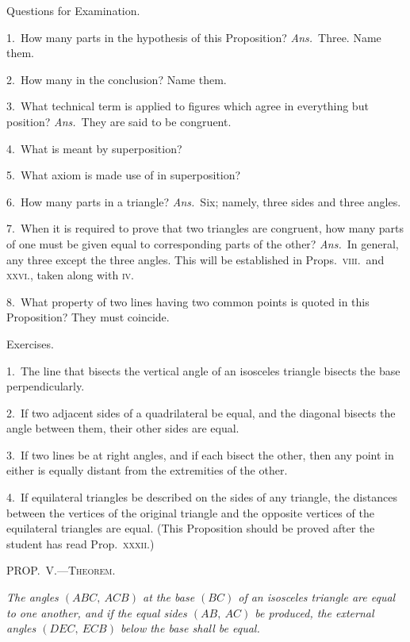 \documentclass[oneside]{book}
\newcommand\mypropl[2]{
\bigskip\Needspace*{4\baselineskip}\begin{center}\textsc{#1}\end{center}
\hspace{\parindent}\emph{#2}\par\medskip
}
\newcommand\exhead[1]{
\Needspace*{5\baselineskip}\begin{center}
\textsf{#1}
\end{center}
}
\begin{document}
\exhead{Questions for Examination.}

\begin{footnotesize}
1.~How many parts in the hypothesis of this Proposition? \textit{Ans.}\
Three. Name them.

2.~How many in the conclusion? Name them.

3.~What technical term is applied to figures which agree in
everything but position? \textit{Ans.}\ They are said to be congruent.

4.~What is meant by superposition?

5.~What axiom is made use of in superposition?

6.~How many parts in a triangle? \textit{Ans.}\ Six; namely, three
sides and three angles.

7.~When it is required to prove that two triangles are congruent,
how many parts of one must be given equal to corresponding
parts of the other? \textit{Ans.}\ In general, any three except
the three angles. This will be established in Props.~\textsc{viii.}\ and
\textsc{xxvi.}, taken along with \textsc{iv.}

8.~What property of two lines having two common points is
quoted in this Proposition? They must coincide.
\par\end{footnotesize}


\exhead{Exercises.}

\begin{footnotesize}
1.~The line that bisects the vertical angle of an isosceles triangle
bisects the base perpendicularly.

2.~If two adjacent sides of a quadrilateral be equal, and the
diagonal bisects the angle between them, their other sides are
equal.

3.~If two lines be at right angles, and if each bisect the other,
then any point in either is equally distant from the extremities of
the other.

4.~If equilateral triangles be described on the sides of any
triangle, the distances between the vertices of the original triangle
and the opposite vertices of the equilateral triangles are equal.
(This Proposition should be proved after the student has read
Prop.~\textsc{xxxii.})
\par\end{footnotesize}


\mypropl{PROP\@.~V.---Theorem.}{The angles $(ABC,\ ACB)$ at the base $(BC)$ of an isosceles
triangle are equal to one another, and if the equal sides
$(AB,\ AC)$ be produced, the external angles $(DEC,\ ECB)$
below the base shall be equal.}
\end{document}
